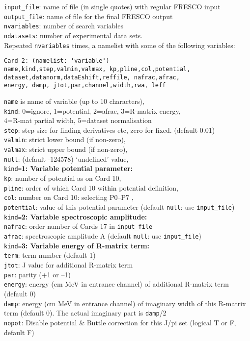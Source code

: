 \documentclass[11pt]{article}
\begin{document}
{\tt input\_file}: name of file (in single quotes) with regular FRESCO input\\
{\tt output\_file}: name of file for the final FRESCO output\\
{\tt nvariables}: number of search variables\\
{\tt ndatasets}:  number of experimental data sets.\\

Repeated {\tt nvariables} times, a namelist with some of the following variables:
\begin{verbatim}
Card 2: (namelist: 'variable')
name,kind,step,valmin,valmax, kp,pline,col,potential,
dataset,datanorm,dataEshift,reffile, nafrac,afrac,
energy, damp, jtot,par,channel,width,rwa, leff
\end{verbatim}
{\tt name} is name of variable (up to 10 characters),\\
{\tt kind}: 0=ignore, 1=potential, 2=afrac, 3=R-matrix energy,\\
   \hspace*{10mm} 4=R-mat partial width, 5=dataset normalisation\\
{\tt step}: step size for finding derivatives etc, zero for fixed. (default 0.01)\\
{\tt valmin}: strict lower bound (if non-zero),\\
{\tt valmax}: strict upper bound (if non-zero), \\
{\tt null}: (default -124578) `undefined' value,\\

{\tt kind=}{\bf 1: Variable potential parameter:}\\
{\tt kp}: number of potential as on Card 10,\\
{\tt pline}: order of which Card 10 within potential definition,\\
{\tt col}:   number on Card 10: selecting P0--P7 ,\\
{\tt potential}: value of this potential parameter (default {\tt null}: use {\tt input\_file})\\

{\tt kind=}{\bf 2: Variable spectroscopic amplitude:}\\
{\tt nafrac}: order number of Cards 17 in {\tt input\_file}\\
{\tt afrac}: spectroscopic amplitude A (default {\tt null}: use {\tt input\_file})\\

{\tt kind=}{\bf 3: Variable energy of R-matrix term:}\\
{\tt term}: term number (default 1)\\
{\tt jtot}: J value for additional R-matrix term\\
{\tt par}: parity (+1 or --1)\\
{\tt energy}: energy (cm MeV in entrance channel) of additional R-matrix term (default 0)\\
{\tt damp}: energy (cm MeV in entrance channel) of imaginary width of this R-matrix term (default 0). The actual  imaginary part is {\tt damp}/2\\
{\tt nopot}: Disable potential \& Buttle correction for this J/pi set (logical T or F, default F)\\
\end{document}
